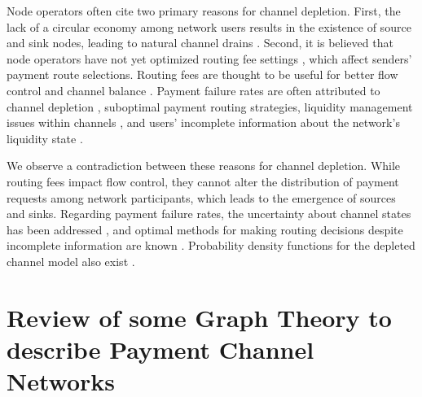 \documentclass[10pt,twocolumn]{article}
\begin{document}
Node operators often cite two primary reasons for channel depletion. First, the lack of a circular economy among network users results in the existence of source and sink nodes, leading to natural channel drains \cite{pickhardt2022valves}. Second, it is believed that node operators have not yet optimized routing fee settings \cite{zhang2023rethinking}, which affect senders' payment route selections. Routing fees are thought to be useful for better flow control and channel balance \cite{ren2018optimal}. Payment failure rates are often attributed to channel depletion \cite{alscher2023price}, suboptimal payment routing strategies, liquidity management issues within channels \cite{pickhardt2020imbalance}, and users' incomplete information about the network's liquidity state \cite{pickhardt2021security}.

We observe a contradiction between these reasons for channel depletion. While routing fees impact flow control, they cannot alter the distribution of payment requests among network participants, which leads to the emergence of sources and sinks. Regarding payment failure rates, the uncertainty about channel states has been addressed \cite{pickhardt2021security}, and optimal methods for making routing decisions despite incomplete information are known \cite{pickhardt2021optimally}. Probability density functions for the depleted channel model also exist \cite{bitromortac2024blazing,rossi2024channel}.





\section{Review of some Graph Theory to describe Payment Channel Networks}
\end{document}
